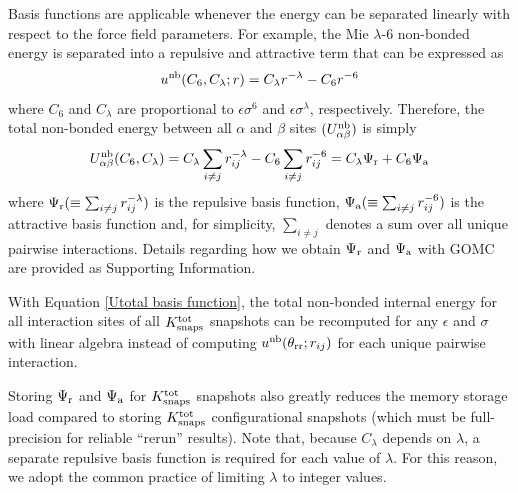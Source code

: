 \documentclass[journal=jced,manuscript=article]{achemso}
\begin{document}
Basis functions are applicable whenever the energy can be separated linearly with respect to the force field parameters. For example, the Mie $\lambda$-6 non-bonded energy is separated into a repulsive and attractive term that can be expressed as
\begin{equation} \label{Mie basis function}
u^{\rm nb}(C_6,C_\lambda;r) = C_\lambda r^{-\lambda} - C_6 r^{-6}
\end{equation} 
where $C_6$ and $C_\lambda$ are proportional to $\epsilon \sigma^6$ and $\epsilon \sigma^\lambda$, respectively. Therefore, the total non-bonded energy between all $\alpha$ and $\beta$ sites $(U_{\alpha\beta}^{\rm nb})$ is simply
\begin{equation} \label{Utotal basis function}
U_{\alpha\beta}^{\rm nb}(C_6,C_\lambda) = C_\lambda \sum_{i \neq j} r_{ij}^{-\lambda} - C_6 \sum_{i \neq j} r_{ij}^{-6} = C_\lambda \Psi_{\rm r} + C_6 \Psi_{\rm a}
\end{equation}
where $\Psi_{\rm r} (\equiv \sum_{i \neq j} r_{ij}^{-\lambda})$ is the repulsive basis function, $\Psi_{\rm a} (\equiv \sum_{i \neq j} r_{ij}^{-6})$ is the attractive basis function and, for simplicity, $\sum_{i \neq j}$ denotes a sum over all unique pairwise interactions. Details regarding how we obtain $\Psi_{\rm r}$ and $\Psi_{\rm a}$ with GOMC are provided as Supporting Information.

With Equation \ref{Utotal basis function}, the total non-bonded internal energy for all interaction sites of all $K^{\rm tot}_{\rm snaps}$ snapshots can be recomputed for any $\epsilon$ and $\sigma$ with linear algebra instead of computing $u^{\rm nb}(\theta_{\rm rr};r_{ij})$ for each unique pairwise interaction. 

Storing $\Psi_{\rm r}$ and $\Psi_{\rm a}$ for $K^{\rm tot}_{\rm snaps}$ snapshots also greatly reduces the memory storage load compared to storing $K^{\rm tot}_{\rm snaps}$ configurational snapshots (which must be full-precision for reliable ``rerun'' results). Note that, because $C_\lambda$ depends on $\lambda$, a separate repulsive basis function is required for each value of $\lambda$. For this reason, we adopt the common practice of limiting $\lambda$ to integer values.

\end{document}
